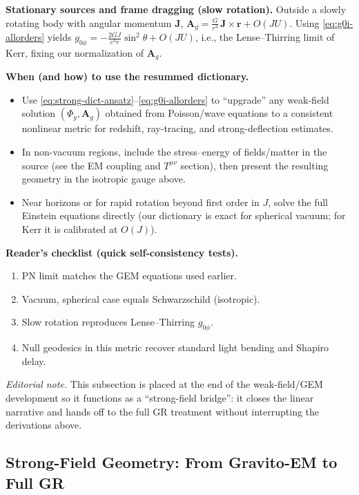 \medskip
\noindent\textbf{Stationary sources and frame dragging (slow rotation).}
Outside a slowly rotating body with angular momentum \(\mathbf J\),
\(\mathbf A_g=\tfrac{G}{r^3}\,\mathbf J\times\mathbf r + O(JU)\).
Using \eqref{eq:g0i-allorders} yields \(g_{0\phi}=-\tfrac{2GJ}{c^3 r}\sin^2\theta+O(JU)\),
i.e., the Lense--Thirring limit of Kerr, fixing our normalization of \(\mathbf A_g\).

\medskip
\noindent\textbf{When (and how) to use the resummed dictionary.}
\begin{itemize}
  \item Use \eqref{eq:strong-dict-ansatz}--\eqref{eq:g0i-allorders} to ``upgrade'' any weak-field solution \((\Phi_g,\mathbf A_g)\) obtained from Poisson/wave equations to a consistent nonlinear metric for redshift, ray-tracing, and strong-deflection estimates.
  \item In non-vacuum regions, include the stress--energy of fields/matter in the source (see the EM coupling and \(T^{\mu\nu}\) section), then present the resulting geometry in the isotropic gauge above.
  \item Near horizons or for rapid rotation beyond first order in \(J\), solve the full Einstein equations directly (our dictionary is exact for spherical vacuum; for Kerr it is calibrated at \(O(J)\)).
\end{itemize}

\medskip
\noindent\textbf{Reader’s checklist (quick self-consistency tests).}
\begin{enumerate}
  \item PN limit matches the GEM equations used earlier.
  \item Vacuum, spherical case equals Schwarzschild (isotropic).
  \item Slow rotation reproduces Lense--Thirring \(g_{0\phi}\).
  \item Null geodesics in this metric recover standard light bending and Shapiro delay.
\end{enumerate}

\noindent\textit{Editorial note.}
This subsection is placed at the end of the weak-field/GEM development so it functions as a ``strong-field bridge'': it closes the linear narrative and hands off to the full GR treatment without interrupting the derivations above.


\subsection{Strong-Field Geometry: From Gravito-EM to Full GR}
\label{sec:strong-field-geometry}

